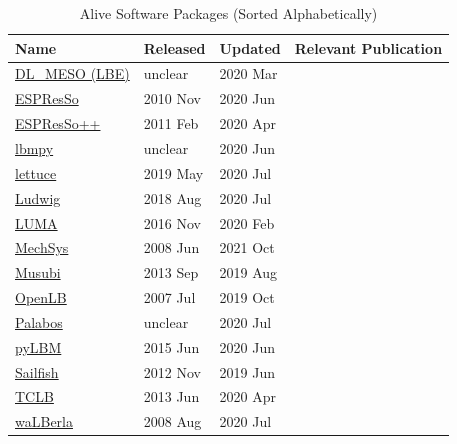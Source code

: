 \documentclass[final, 3p, times, authoryear]{elsarticle}
\begin{document}
\begin{table}[ht!]
	\begin{center}
		\begin{tabular}{ p{3cm}p{2cm}p{2cm}p{5.5cm} }
			\toprule
			Name & Released & Updated & Relevant Publication\\
			\midrule
			\href{https://www.ccp5.ac.uk/sites/www.ccp5.ac.uk/files/dl_meso/data/dl_meso_2.7.zip}{DL\_MESO (LBE)} & unclear & 2020 Mar&\citep{seaton2013dlmeso}\\
			\href{https://github.com/espressomd/espresso}{ESPResSo} & 2010 Nov & 2020 Jun&\citep{weik2019espresso}\\
			\href{https://github.com/espressopp/espressopp}{ESPResSo++} & 2011 Feb & 2020 Apr&\citep{halverson2013espresso++}\\
			\href{https://github.com/mabau/lbmpy}{lbmpy}& unclear  & 2020 Jun & \citep{bauer2021lbmpy}\\
			\href{https://github.com/Olllom/lettuce}{lettuce} & 2019 May & 2020 Jul&\citep{bedrunka2021lettuce}\\
			\href{https://github.com/ludwig-cf/ludwig}{Ludwig} & 2018 Aug & 2020 Jul&\citep{desplat2001ludwig}\\
			\href{https://github.com/aharwood2/LUMA}{LUMA} & 2016 Nov   & 2020 Feb &\citep{harwood2018luma}\\
			\href{http://hg.savannah.gnu.org/hgweb/mechsys/file/tip/}{MechSys} & 2008 Jun    & 2021 Oct &\citep{galindo2013coupled}\\
			\href{https://osdn.net/projects/apes/scm/hg/musubi/}{Musubi} & 2013 Sep & 2019 Aug &\citep{hasert2014complex}\\
			\href{https://www.openlb.net/download/}{OpenLB} & 2007 Jul & 2019 Oct &\citep{heuveline2010openlb}\\
			\href{https://gitlab.com/unigespc/palabos}{Palabos} & unclear & 2020 Jul &\citep{latt2021palabos}\\
			\href{https://github.com/pylbm/pylbm}{pyLBM} & 2015 Jun&   2020 Jun &\\
			\href{https://github.com/sailfish-team/sailfish}{Sailfish} & 2012 Nov & 2019 Jun & \citep{januszewski2014sailfish}\\
			\href{https://github.com/CFD-GO/TCLB}{TCLB} & 2013 Jun  & 2020 Apr & \citep{rokicki2016adjoint}\\
			\href{https://i10git.cs.fau.de/walberla/walberla}{waLBerla} & 2008 Aug & 2020 Jul & \citep{bauer2021walberla}\\
			\bottomrule
		\end{tabular}
		\caption{Alive Software Packages (Sorted Alphabetically)} \label{alivepackages}
	\end{center}
\end{table}
\end{document}
